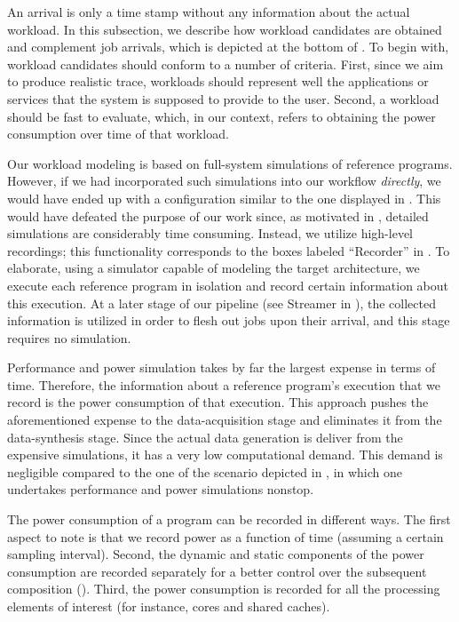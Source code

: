 An arrival is only a time stamp without any information about the actual
workload. In this subsection, we describe how workload candidates are obtained
and complement job arrivals, which is depicted at the bottom of
. To begin with, workload candidates should conform to a
number of criteria. First, since we aim to produce realistic trace, workloads
should represent well the applications or services that the system is supposed
to provide to the user. Second, a workload should be fast to evaluate, which, in
our context, refers to obtaining the power consumption over time of that
workload.

Our workload modeling is based on full-system simulations of reference programs.
However, if we had incorporated such simulations into our workflow
\emph{directly}, we would have ended up with a configuration similar to the one
displayed in . This would have defeated the purpose of our
work since, as motivated in , detailed simulations are
considerably time consuming. Instead, we utilize high-level recordings; this
functionality corresponds to the boxes labeled ``Recorder'' in
. To elaborate, using a simulator capable of modeling the
target architecture, we execute each reference program in isolation and record
certain information about this execution. At a later stage of our pipeline (see
Streamer in ), the collected information is utilized in order
to flesh out jobs upon their arrival, and this stage requires no simulation.

Performance and power simulation takes by far the largest expense in terms of
time. Therefore, the information about a reference program's execution that we
record is the power consumption of that execution. This approach pushes the
aforementioned expense to the data-acquisition stage and eliminates it from the
data-synthesis stage. Since the actual data generation is deliver from the
expensive simulations, it has a very low computational demand. This demand is
negligible compared to the one of the scenario depicted in ,
in which one undertakes performance and power simulations nonstop.

The power consumption of a program can be recorded in different ways. The first
aspect to note is that we record power as a function of time (assuming a certain
sampling interval). Second, the dynamic and static components of the power
consumption are recorded separately for a better control over the subsequent
composition (). Third, the power consumption is recorded for
all the processing elements of interest (for instance, cores and shared caches).

